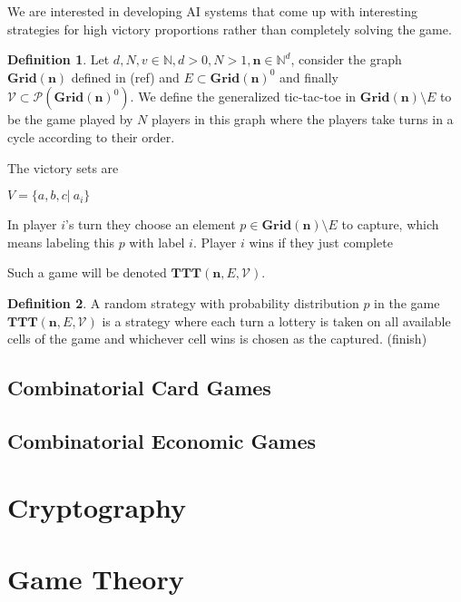 \documentclass[]{article}
\theoremstyle{definition}
\newtheorem{definition}{Definition}[section]
\theoremstyle{definition}
\newcommand{\ttt}{\textbf{TTT}}
\newcommand{\grid}{\textbf{Grid}}
\newcommand{\bb}{\mathbb}
\begin{document}
We are interested in developing AI systems that come up with interesting strategies for high victory proportions rather than completely solving the game. 

\begin{definition}
	Let $d, N, v \in \bb{N}, d > 0, N > 1, \textbf{n} \in \bb{N}^d$, consider the graph $\grid(\textbf{n})$ defined in (ref) and $E \subset \grid(\textbf{n})^0$ and finally $\mathcal{V} \subset \mathcal{P}(\grid(\textbf{n})^0)$. We define the generalized tic-tac-toe in $\grid(\textbf{n}) \setminus E$ to be the game played by $N$ players in this graph where the players take turns in a cycle according to their order. 
	
	The victory sets are
	
	\begin{center}
		$V = \{ a, b, c| \ a_i \}$
	\end{center}

	
	In player $i$'s turn they choose an element $p \in \grid(\textbf{n}) \setminus E$ to capture, which means labeling this $p$ with label $i$. Player $i$ wins if they just complete 

	Such a game will be denoted $\ttt(\textbf{n}, E, \mathcal{V})$.

\end{definition}

\begin{definition}
	A random strategy with probability distribution $p$ in the game $\ttt(\textbf{n}, E, \mathcal{V})$ is a strategy where each turn a lottery is taken on all available cells of the game and whichever cell wins is chosen as the captured. (finish)
\end{definition}




\subsection{Combinatorial Card Games}
\subsection{Combinatorial Economic Games}

\section{Cryptography}
\section{Game Theory}
\end{document}
